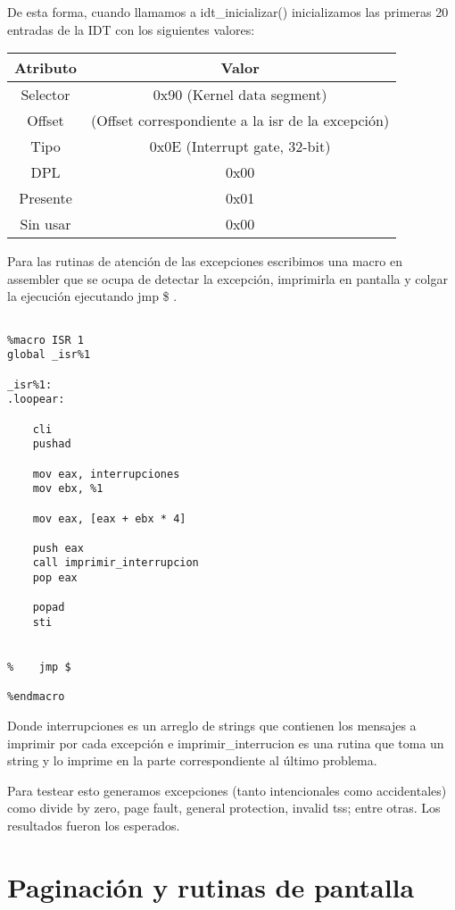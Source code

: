 \documentclass[10pt, a4paper]{article}
\begin{document}
De esta forma, cuando llamamos a idt\_inicializar() inicializamos las primeras 20 entradas de la IDT con los siguientes valores:

\begin{center}
\begin{tabular}{| c || c |}

	\hline
		Atributo & Valor\\
	\hline
		Selector & 0x90 (Kernel data segment)\\
		Offset & (Offset correspondiente a la isr de la excepci\'on)\\
		Tipo & 0x0E (Interrupt gate, 32-bit)\\
		DPL & 0x00\\
		Presente & 0x01\\
		Sin usar & 0x00\\
	\hline

\end{tabular}
\end{center}

Para las rutinas de atenci\'on de las excepciones escribimos una macro en assembler que se ocupa de detectar la excepci\'on,
imprimirla en pantalla y colgar la ejecuci\'on ejecutando jmp \$ .

\begin{verbatim}

%macro ISR 1
global _isr%1

_isr%1:
.loopear:
	
    cli
    pushad
	
    mov eax, interrupciones
    mov ebx, %1 
		
    mov eax, [eax + ebx * 4]
	
    push eax
    call imprimir_interrupcion
    pop eax
	
    popad
    sti
	
	
%    jmp $

%endmacro

\end{verbatim}


Donde interrupciones es un arreglo de strings que contienen los mensajes a imprimir por cada excepci\'on
e imprimir\_interrucion es una rutina que toma un string y lo imprime en la parte correspondiente al \'ultimo problema.

Para testear esto generamos excepciones (tanto intencionales como accidentales) como divide by zero, page fault,
general protection, invalid tss; entre otras. Los resultados fueron los esperados.


\section{Paginaci\'on y rutinas de pantalla}
\end{document}
